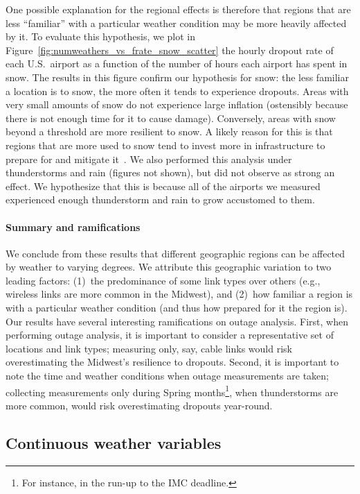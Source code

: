 
One possible explanation for the regional effects is therefore that
regions that are less ``familiar'' with a particular weather condition
may be more heavily affected by it.
%
To evaluate this hypothesis, we plot in
Figure~\ref{fig:numweathers_vs_frate_snow_scatter} the hourly dropout
rate of each U.S.~airport as a function of the number of hours each
airport has spent in snow.
%
The results in this figure confirm our hypothesis for snow: the less
familiar a location is to snow, the more often it tends to experience
dropouts.
%
Areas with very small amounts of snow do not experience large
inflation  (ostensibly because there is not enough time for it to
cause damage).
%
Conversely, areas with snow beyond a threshold are more resilient to
snow.
%
A likely reason for this is that regions that are more used to snow
tend to invest more in infrastructure to prepare for and mitigate
it~\cite{state-dots-snow-spending}.
%
We also performed this analysis under thunderstorms and rain (figures
not shown), but did not observe as strong an effect.
%
We hypothesize that this is because all of the airports we measured
experienced enough thunderstorm and rain to grow accustomed to them.

\paragraph{Summary and ramifications}
%
We conclude from these results that different geographic regions can be
affected by weather to varying degrees.
%
We attribute this geographic variation to two leading factors: (1)~the
predominance of some link types over others (e.g., wireless links are
more common in the Midwest), and (2)~how familiar a region is with a
particular weather condition (and thus how prepared for it the region
is).
%
Our results have several interesting ramifications on outage analysis.
%
First, when performing outage analysis, it is important to consider a
representative set of locations and link types; measuring only, say,
cable links would risk overestimating the Midwest's resilience to
dropouts.
%
Second, it is important to note the time and weather conditions when
outage measurements are taken; collecting measurements only during
Spring months\footnote{For instance, in the run-up to the IMC
deadline.}, when thunderstorms are more common, would risk
overestimating dropouts year-round.




\subsection{Continuous weather variables} %
\label{sec:continuous}

